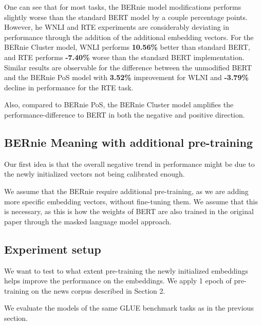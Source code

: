 \documentclass[a4paper,12pt,twoside,openright]{report}
\begin{document}
One can see that for most tasks, the BERnie model modifications performs slightly worse than the standard BERT model by a couple percentage points.
However, he WNLI and RTE experiments are considerably deviating in performance through the addition of the additional embedding vectors.
For the BERnie Cluster model, WNLI performs \textbf{10.56\%} better than standard BERT, and RTE performs  \textbf{-7.40\%} worse than the standard BERT implementation.
Similar results are observable for the difference between the unmodified BERT and the BERnie PoS model with \textbf{3.52\%} improvement for WLNI and \textbf{-3.79\%} decline in performance for the RTE task.

Also, compared to BERnie PoS, the BERnie Cluster model amplifies the performance-difference to BERT in both the negative and positive direction.




\subsection{BERnie Meaning with additional pre-training}

Our first idea is that the overall negative trend in performance might be due to the newly initialized vectors not being calibrated enough.

We assume that the BERnie require additional pre-training, as we are adding more specific embedding vectors, without fine-tuning them.
We assume that this is necessary, as this is how the weights of BERT are also trained in the original paper \cite{devlin18} through the masked language model approach.

\subsection{Experiment setup}

We want to test to what extent pre-training the newly initialized embeddings helps improve the performance on the embeddings.
We apply 1 epoch of pre-training on the news corpus described in Section 2.

We evaluate the models of the same GLUE benchmark tasks as in the previous section.
\end{document}
